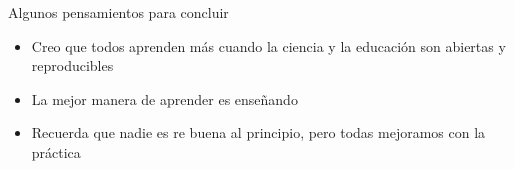 \documentclass[ignorenonframetext,]{beamer}
\providecommand{\tightlist}{%
  \setlength{\itemsep}{0pt}\setlength{\parskip}{0pt}}
\begin{document}
\begin{frame}{Algunos pensamientos para concluir}
\protect\hypertarget{algunos-pensamientos-para-concluir}{}

\begin{itemize}[<+->]
\tightlist
\item
  Creo que todos aprenden más cuando la ciencia y la educación son
  abiertas y reproducibles
\item
  La mejor manera de aprender es enseñando
\item
  Recuerda que nadie es re buena al principio, pero todas mejoramos con
  la práctica
\end{itemize}

\end{frame}

\end{document}
